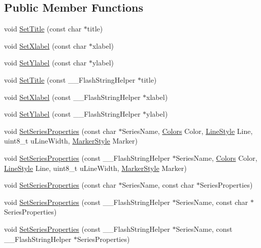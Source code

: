 \subsection*{Public Member Functions}
\begin{DoxyCompactItemize}
\item 
void \hyperlink{class_plot_a70c2bc73dd360c27db0b9b98f5b780f2}{Set\-Title} (const char $\ast$title)
\item 
void \hyperlink{class_plot_a905727fa06e444bb07b7654636fe425c}{Set\-Xlabel} (const char $\ast$xlabel)
\item 
void \hyperlink{class_plot_afde2f71023540250c01a36e174c0fc88}{Set\-Ylabel} (const char $\ast$ylabel)
\item 
void \hyperlink{class_plot_a20a0d661c1629b318cda6da138c7bd5d}{Set\-Title} (const \-\_\-\-\_\-\-Flash\-String\-Helper $\ast$title)
\item 
void \hyperlink{class_plot_a7a25ed9443440e71e2ac4fb311a17bb6}{Set\-Xlabel} (const \-\_\-\-\_\-\-Flash\-String\-Helper $\ast$xlabel)
\item 
void \hyperlink{class_plot_a9e190c06665d7239e426d48cbc4228d8}{Set\-Ylabel} (const \-\_\-\-\_\-\-Flash\-String\-Helper $\ast$ylabel)
\item 
void \hyperlink{class_plot_a6b9c7f27a012639a685de8dd5027b6ec}{Set\-Series\-Properties} (const char $\ast$Series\-Name, \hyperlink{class_plot_af4d6704578791a812f3f78617adc7040}{Colors} Color, \hyperlink{class_plot_a05a5ea232f5115847a9861a9660205c7}{Line\-Style} Line, uint8\-\_\-t u\-Line\-Width, \hyperlink{class_plot_a888bde9c76bb38843a5ab09097cbeeab}{Marker\-Style} Marker)
\item 
void \hyperlink{class_plot_a4a5bae99b22226dd4fb2535f0b65cf96}{Set\-Series\-Properties} (const \-\_\-\-\_\-\-Flash\-String\-Helper $\ast$Series\-Name, \hyperlink{class_plot_af4d6704578791a812f3f78617adc7040}{Colors} Color, \hyperlink{class_plot_a05a5ea232f5115847a9861a9660205c7}{Line\-Style} Line, uint8\-\_\-t u\-Line\-Width, \hyperlink{class_plot_a888bde9c76bb38843a5ab09097cbeeab}{Marker\-Style} Marker)
\item 
void \hyperlink{class_plot_a34a49416b1cdc6c151805d4df5ee46b7}{Set\-Series\-Properties} (const char $\ast$Series\-Name, const char $\ast$Series\-Properties)
\item 
void \hyperlink{class_plot_aa7a8a80ff45450ccbbd40bc9e57983ba}{Set\-Series\-Properties} (const \-\_\-\-\_\-\-Flash\-String\-Helper $\ast$Series\-Name, const char $\ast$Series\-Properties)
\item 
void \hyperlink{class_plot_a8fbcd1359b61be40f3e8318190d60e29}{Set\-Series\-Properties} (const \-\_\-\-\_\-\-Flash\-String\-Helper $\ast$Series\-Name, const \-\_\-\-\_\-\-Flash\-String\-Helper $\ast$Series\-Properties)
\end{DoxyCompactItemize}
